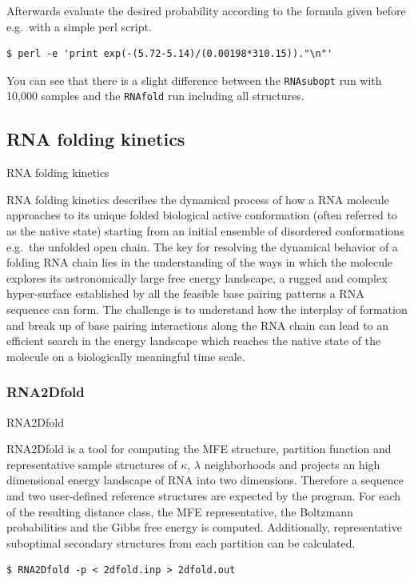 \documentclass[]{article}
\begin{document}
Afterwards evaluate the desired probability according to the formula
given before e.g.~with a simple perl script.

\begin{verbatim}
$ perl -e 'print exp(-(5.72-5.14)/(0.00198*310.15))."\n"'
\end{verbatim}

You can see that there is a slight difference between the
\texttt{RNAsubopt} run with 10,000 samples and the \texttt{RNAfold} run
including all structures.

\subsection{RNA folding kinetics}{RNA folding kinetics}\label{rna-folding-kinetics}

RNA folding kinetics describes the dynamical process of how a RNA
molecule approaches to its unique folded biological active conformation
(often referred to as the native state) starting from an initial
ensemble of disordered conformations e.g.~the unfolded open chain. The
key for resolving the dynamical behavior of a folding RNA chain lies in
the understanding of the ways in which the molecule explores its
astronomically large free energy landscape, a rugged and complex
hyper-surface established by all the feasible base pairing patterns a
RNA sequence can form. The challenge is to understand how the interplay
of formation and break up of base pairing interactions along the RNA
chain can lead to an efficient search in the energy landscape which
reaches the native state of the molecule on a biologically meaningful
time scale.

\subsubsection{RNA2Dfold}{RNA2Dfold}\label{rna2dfold}

RNA2Dfold is a tool for computing the MFE structure, partition function
and representative sample structures of \(\kappa\), \(\lambda\)
neighborhoods and projects an high dimensional energy landscape of RNA
into two dimensions. Therefore a sequence and two user-defined reference
structures are expected by the program. For each of the resulting
distance class, the MFE representative, the Boltzmann probabilities and
the Gibbs free energy is computed. Additionally, representative
suboptimal secondary structures from each partition can be calculated.

\begin{verbatim}
$ RNA2Dfold -p < 2dfold.inp > 2dfold.out
\end{verbatim}
\end{document}
